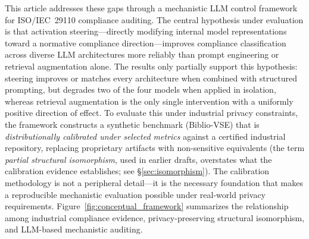\documentclass{ieeeaccess}
\begin{document}
This article addresses these gaps through a mechanistic LLM control framework for ISO/IEC~29110 compliance auditing. The central hypothesis under evaluation is that activation steering---directly modifying internal model representations toward a normative compliance direction---improves compliance classification across diverse LLM architectures more reliably than prompt engineering or retrieval augmentation alone. The results only partially support this hypothesis: steering improves or matches every architecture when combined with structured prompting, but degrades two of the four models when applied in isolation, whereas retrieval augmentation is the only single intervention with a uniformly positive direction of effect. To evaluate this under industrial privacy constraints, the framework constructs a synthetic benchmark (Biblio-VSE) that is \emph{distributionally calibrated under selected metrics} against a certified industrial repository, replacing proprietary artifacts with non-sensitive equivalents (the term \emph{partial structural isomorphism}, used in earlier drafts, overstates what the calibration evidence establishes; see §\ref{sec:isomorphism}). The calibration methodology is not a peripheral detail---it is the necessary foundation that makes a reproducible mechanistic evaluation possible under real-world privacy requirements. Figure~\ref{fig:conceptual_framework} summarizes the relationship among industrial compliance evidence, privacy-preserving structural isomorphism, and LLM-based mechanistic auditing.
\end{document}
